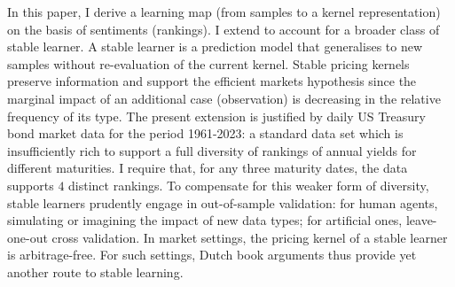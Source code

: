 %
%
%
%
%
%
%
%
%
%
In this paper, I derive a learning map (from samples to a kernel
representation) on the basis of sentiments (rankings).  I extend
\citep{GS_Inductive_inference} to account for a broader class of stable
learner.  A stable learner is a prediction model that generalises to new
samples without re-evaluation of the current kernel.  Stable pricing kernels
preserve information and support the efficient markets hypothesis since the
marginal impact of an additional case (observation) is decreasing in the
relative frequency of its type.  The present extension is justified by daily
US Treasury bond market data for the period 1961-2023: a standard data set
which is insufficiently rich to support a full diversity of rankings of annual
yields for different maturities.  I require that, for any three maturity dates,
the data supports $4$ distinct rankings.  To compensate for this weaker form of
diversity, stable learners prudently engage in out-of-sample validation: for
human agents, simulating or imagining the impact of new data types; for
artificial ones, leave-one-out cross validation. In market settings, the
pricing kernel of a stable learner is arbitrage-free. For such settings, Dutch
book arguments thus provide yet another route to stable learning.

